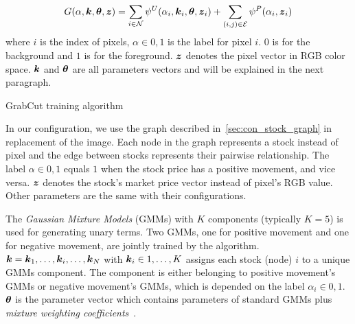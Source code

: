 \begin{align}
  \label{eq:grabcut_energy}
  G(\alpha, {\boldsymbol{k}}, \boldsymbol{\theta}, {\boldsymbol{z}}) = 
  \sum_{i\in {\cal N}}{\psi^U(\alpha_i, {\boldsymbol{k}}_i, \boldsymbol{\theta}, {\boldsymbol{z}}_i)}+
  \sum_{(i,j)\in {\cal E}}{\psi^P(\alpha_i,{\boldsymbol{z}}_i)}
\end{align}
where $i$ is the index of pixels, $\alpha \in {0,1}$ is the label
for pixel $i$. $0$ is for the background and $1$ is for the
foreground. ${\boldsymbol{z}}$ denotes the pixel vector in RGB color space.
${\boldsymbol{k}}$ and $\boldsymbol{\theta}$ are all parameters vectors and will be
explained in the next paragraph. 

\begin{algorithm}[tb]
  \begin{algorithmic}[1]
    \REPEAT
  \end{algorithmic}
  \caption{\label{alg:grabcut} GrabCut training algorithm}
\end{algorithm}

In our configuration, we use the graph described
in~\ref{sec:con_stock_graph} in replacement of the image. Each
node in the graph represents a stock instead of pixel and the
edge between stocks represents their pairwise relationship. The
label $\alpha \in {0,1}$ equals $1$ when the stock price has a
positive movement, and vice versa. ${\boldsymbol{z}}$ denotes the stock's
market price vector instead of pixel's RGB value. Other
parameters are the same with their configurations.

The \emph{Gaussian Mixture Models} (GMMs) with $K$ components
(typically $K=5$) is used for generating unary terms. Two GMMs,
one for positive movement and one for negative movement, are
jointly trained by the algorithm.
${\boldsymbol{k}}={{\boldsymbol{k}}_1,\dots,{\boldsymbol{k}}_i,\dots,{\boldsymbol{k}}_N}$ with ${\boldsymbol{k}}_i\in 1,\dots,K$
assigns each stock (node) $i$ to a unique GMMs component. The
component is either belonging to positive movement's GMMs or
negative movement's GMMs, which is depended on the label
$\alpha_i\in {0,1}$. $\boldsymbol{\theta}$ is the parameter vector which
contains parameters of standard GMMs plus \emph{mixture weighting
  coefficients}~\cite{Rother:SIGGRAPH04}.

